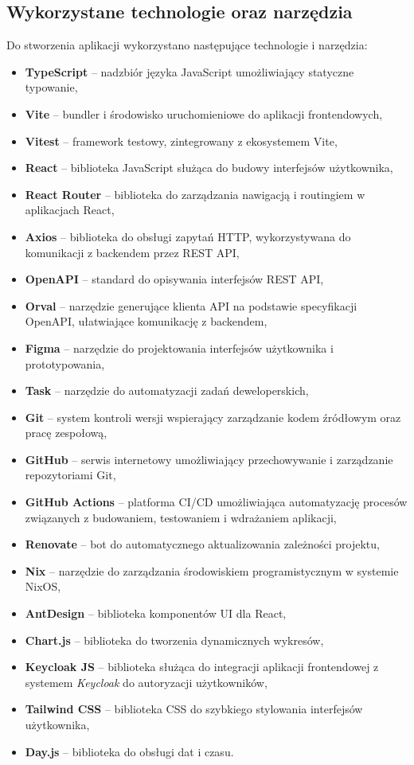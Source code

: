 \documentclass[../../spr.tex]{subfiles}
\begin{document}
\subsection{Wykorzystane technologie oraz narzędzia}
Do stworzenia aplikacji wykorzystano następujące technologie i narzędzia:
\begin{itemize}
    \item \textbf{TypeScript} – nadzbiór języka JavaScript umożliwiający statyczne typowanie,
    \item \textbf{Vite} – bundler i środowisko uruchomieniowe do 
    aplikacji frontendowych,
    \item \textbf{Vitest} – framework testowy, zintegrowany z ekosystemem Vite,
    \item \textbf{React} – biblioteka JavaScript służąca do budowy
    interfejsów użytkownika,
    \item \textbf{React Router} – biblioteka do zarządzania nawigacją i routingiem w aplikacjach React,
    \item \textbf{Axios} – biblioteka do obsługi zapytań HTTP,
    wykorzystywana do komunikacji z backendem przez REST API,
    \item \textbf{OpenAPI} – standard do opisywania interfejsów REST API,
    \item \textbf{Orval} – narzędzie generujące klienta API na podstawie specyfikacji OpenAPI,
    ułatwiające komunikację z backendem,
    \item \textbf{Figma} – narzędzie do projektowania interfejsów użytkownika i prototypowania,
    \item \textbf{Task} – narzędzie do automatyzacji zadań deweloperskich,
    \item \textbf{Git} – system kontroli wersji wspierający zarządzanie kodem
    źródłowym oraz pracę zespołową,
    \item \textbf{GitHub} – serwis internetowy umożliwiający przechowywanie i zarządzanie repozytoriami Git,
    \item \textbf{GitHub Actions} – platforma CI/CD umożliwiająca automatyzację
    procesów związanych z budowaniem, testowaniem i wdrażaniem aplikacji,
    \item \textbf{Renovate} – bot do automatycznego aktualizowania zależności projektu,
    \item \textbf{Nix} – narzędzie do zarządzania środowiskiem programistycznym w systemie NixOS,
    \item \textbf{AntDesign} – biblioteka komponentów UI dla React,
    \item \textbf{Chart.js} – biblioteka do tworzenia dynamicznych wykresów,
    \item \textbf{Keycloak JS} – biblioteka służąca do integracji aplikacji frontendowej z systemem \textit{Keycloak} do autoryzacji użytkowników,
    \item \textbf{Tailwind CSS} – biblioteka CSS do szybkiego stylowania interfejsów użytkownika,
    \item \textbf{Day.js} – biblioteka do obsługi dat i czasu.
\end{itemize}
\end{document}
